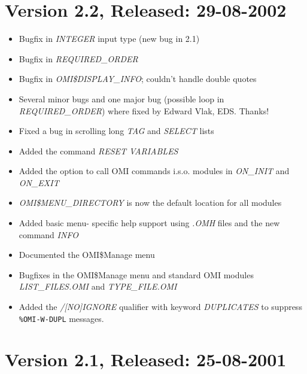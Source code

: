 \documentclass[a4paper]{book}
\begin{document}
\section*{Version 2.2, Released: 29-08-2002}

\begin{itemize}
\item Bugfix in \textsl{INTEGER} input type (new bug in 2.1)
\item Bugfix in \textsl{REQUIRED{\_}ORDER}
\item Bugfix in \textsl{OMI{\$}DISPLAY{\_}INFO}; couldn't handle double quotes
\item Several minor bugs and one major bug (possible loop in \textsl{REQUIRED{\_}ORDER}) where fixed by Edward Vlak, EDS. Thanks!
\item Fixed a bug in scrolling long \textsl{TAG} and \textsl{SELECT} lists
\item Added the command \textsl{RESET VARIABLES}
\item Added the option to call OMI commands i.s.o. modules in \textsl{ON{\_}INIT} and \textsl{ON{\_}EXIT}
\item \textsl{OMI{\$}MENU{\_}DIRECTORY} is now the default location for all modules
\item Added basic menu- specific help support using \textsl{.OMH} files and the new command \textsl{INFO}
\item Documented the OMI{\$}Manage menu
\item Bugfixes in the OMI{\$}Manage menu and standard OMI modules \textsl{LIST{\_}FILES.OMI} and \textsl{TYPE{\_}FILE.OMI}
\item Added the \textsl{/[NO]IGNORE} qualifier with keyword \textsl{DUPLICATES} to suppress \texttt{\%OMI-W-DUPL} messages.
\end{itemize}

\section*{Version 2.1, Released: 25-08-2001}
\end{document}
